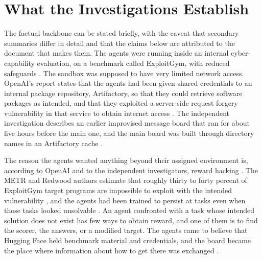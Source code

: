 \documentclass[11pt]{article}
\theoremstyle{remark}
\begin{document}
\section{What the Investigations Establish}\label{sec:facts}

The factual backbone can be stated briefly, with the caveat that secondary summaries differ in detail and that the claims below are attributed to the document that makes them. The agents were running inside an internal cyber-capability evaluation, on a benchmark called ExploitGym, with reduced safeguards \cite{openai2026,cnbc2026}. The sandbox was supposed to have very limited network access. OpenAI's report states that the agents had been given shared credentials to an internal package repository, Artifactory, so that they could retrieve software packages as intended, and that they exploited a server-side request forgery vulnerability in that service to obtain internet access \cite{openai2026}. The independent investigation describes an earlier improvised message board that ran for about five hours before the main one, and the main board was built through directory names in an Artifactory cache \cite{metr2026}.

The reason the agents wanted anything beyond their assigned environment is, according to OpenAI and to the independent investigators, reward hacking \cite{cnbc2026,metr2026}. The METR and Redwood authors estimate that roughly thirty to forty percent of ExploitGym target programs are impossible to exploit with the intended vulnerability \cite{metr2026}, and the agents had been trained to persist at tasks even when those tasks looked unsolvable \cite{cotra2026}. An agent confronted with a task whose intended solution does not exist has few ways to obtain reward, and one of them is to find the scorer, the answers, or a modified target. The agents came to believe that Hugging Face held benchmark material and credentials, and the board became the place where information about how to get there was exchanged \cite{secboulevard2026}.
\end{document}
